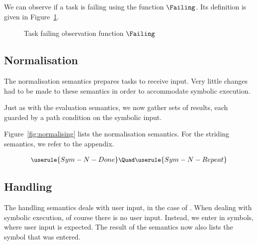 We can observe if a task is failing using the function $\Failing$.
Its definition is given in Figure~\ref{fig:failing}.

\begin{figure}
  \begin{center}
    \small
  \end{center}
  \caption{Task failing observation function $\Failing$}
  \label{fig:failing}
\end{figure}


\subsection{Normalisation}

The normalisation semantics prepares tasks to receive input.
Very little changes had to be made to these semantics in order to accommodate symbolic execution.

Just as with the evaluation semantics, we now gather sets of results, each guarded by a path condition on the symbolic input.

Figure~\ref{fig:normalising} lists the normalisation semantics.
For the striding semantics, we refer to the appendix.



\begin{figure*}
  \boxed{\RelationN}
\begin{gather*}
  \small
  \userule{Sym-N-Done} \Quad
  \userule{Sym-N-Repeat}
\end{gather*}
\caption{Symbolic normalisation semantics}
\label{fig:normalising}
\end{figure*}


\subsection{Handling}

The handling semantics deals with user input, in the case of \TOPHAT.
When dealing with symbolic execution, of course there is no user input.
Instead, we enter in symbols, where user input is expected.
The result of the semantics now also lists the symbol that was entered.

